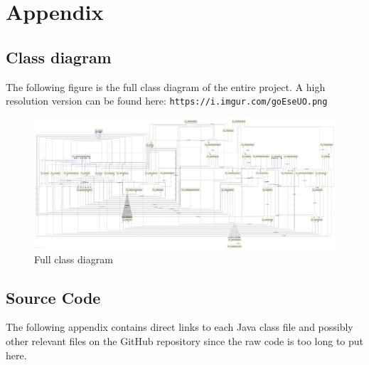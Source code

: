 \documentclass[12p]{article}
\begin{document}

\newpage
\appendix

\section{Appendix}

\subsection{Class diagram} \label{AppendixClassDiagramFull}

The following figure is the full class diagram of the entire project. A high resolution version can be found here: \texttt{https://i.imgur.com/goEseUO.png}

\begin{figure}[ht]
 \centering
 \includegraphics[width=1\textwidth]{Documentation/class_diagram}
 \caption{Full class diagram}
 \label{fig:ClassDiagramFull}
\end{figure}


\newpage
\subsection{Source Code} \label{SourceCode}

The following appendix contains direct links to each Java class file and possibly other relevant files on the GitHub repository since the raw code is too long to put here.
\end{document}

